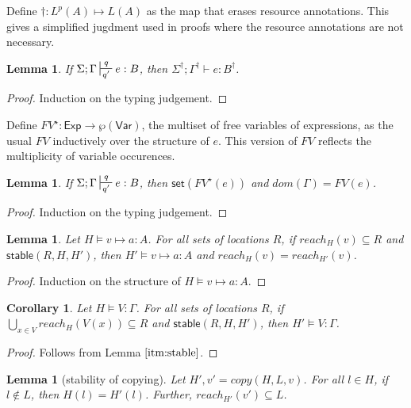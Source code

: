 \documentclass{easychair}
\newcommand{\ms}[1]{\ensuremath{\mathsf{#1}}}
\newcommand{\stable}[1]{\mathsf{stable}(#1)}
\newcommand{\set}[1]{\mathsf{set}(#1)}
\newtheorem{lemma}[theorem]{Lemma}
\newtheorem{corollary}{Corollary}[theorem]
\theoremstyle{definition}
\begin{document}
Define $\dagger :  L^p(A) \mapsto L(A)$ as the map that erases resource annotations. 
This gives a simplified jugdment 
used in proofs where the resource annotations are not necessary.

\begin{lemma}
\label{a} If $\Sigma; \Gamma \sststile{q'}{q} e : B$, then $\Sigma^{\dagger}; \Gamma^{\dagger} \vdash e : B^{\dagger}$.
\end{lemma}

\begin{proof}
Induction on the typing judgement.
\end{proof}

Define $FV^{\star} : \ms{Exp} \to \wp(\ms{Var})$, the multiset of free variables of expressions,
as the usual $FV$ inductively over the structure of $e$. This version of $FV$ reflects 
the multiplicity of variable occurences.

\begin{lemma}\label{itm:linear}
\label{a} If $\Sigma; \Gamma \sststile{q'}{q} e : B$, then $\set{FV^{\star}(e)}$ and $dom(\Gamma) = FV(e)$.
\end{lemma}

\begin{proof}
Induction on the typing judgement.
\end{proof}

\begin{lemma}\label{itm:stable}
Let $H \vDash v \mapsto a : A$. For all sets of locations $R$, if $reach_H(v) \subseteq R$ and $\stable{R,H,H'}$, then $H' \vDash v \mapsto a : A$ and $reach_H(v) = reach_{H'}(v)$.
\end{lemma}

\begin{proof}
Induction on the structure of $H \vDash v \mapsto a : A$.
\end{proof}

\begin{corollary}
Let $H \vDash V : \Gamma$. For all sets of locations $R$, if $\bigcup_{x \in V} reach_H(V(x)) \subseteq R$ and $\stable{R,H,H'}$, then $H' \vDash V : \Gamma$.
\end{corollary}

\begin{proof}
Follows from Lemma $\ref{itm:stable}$.
\end{proof}


\begin{lemma}[stability of copying]
	Let $H',v' = copy(H,L,v)$. For all $l \in H$, if $l \notin L$, then $H(l) = H'(l)$. 
	Further, $reach_{H'}(v') \subseteq L$.
\end{lemma}
\end{document}
